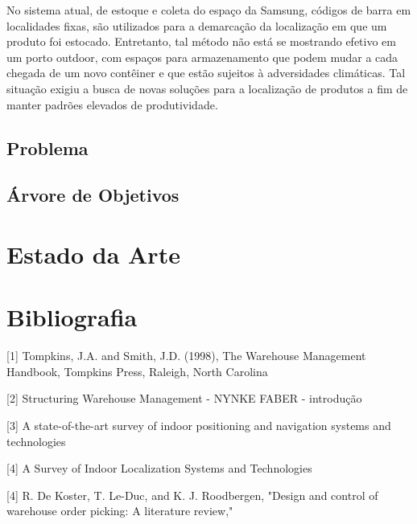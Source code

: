 \documentclass[]{politex}
\begin{document}
No sistema atual, de estoque e coleta do espaço da Samsung, códigos de barra em localidades fixas, são utilizados para a demarcação da localização em que um produto foi estocado. Entretanto, tal método não está se mostrando efetivo em um porto outdoor, com espaços para armazenamento que podem mudar a cada chegada de um novo contêiner e que estão sujeitos à adversidades climáticas. Tal situação exigiu a busca de novas soluções para a localização de produtos a fim de manter padrões elevados de produtividade.

\chapter{Problema}
\chapter{Árvore de Objetivos}

\part{Estado da Arte}

\part{Bibliografia}
[1] Tompkins, J.A. and Smith, J.D. (1998), The Warehouse Management Handbook,
Tompkins Press, Raleigh, North Carolina

[2] Structuring Warehouse
Management - NYNKE FABER - introdução

[3] A state-of-the-art survey of indoor
positioning and navigation systems and
technologies

[4] A Survey of Indoor Localization Systems and
Technologies

[4] R. De Koster, T. Le-Duc, and K. J. Roodbergen, "Design and control
of warehouse order picking: A literature review," 
\end{document}
